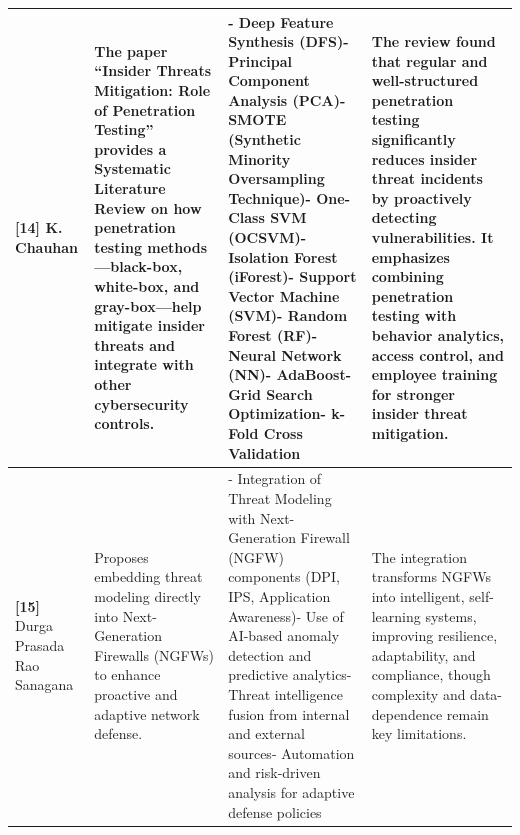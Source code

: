 \begin{scriptsize}
\begin{longtable}{|p{1.8cm}|p{4.2cm}|p{4.0cm}|p{3.8cm}|}
\textbf{[14]} K. Chauhan & The paper ``Insider Threats Mitigation: Role of Penetration Testing'' provides a Systematic Literature Review on how penetration testing methods---black-box, white-box, and gray-box---help mitigate insider threats and integrate with other cybersecurity controls. & - Deep Feature Synthesis (DFS)\newline - Principal Component Analysis (PCA)\newline - SMOTE (Synthetic Minority Oversampling Technique)\newline - One-Class SVM (OCSVM)\newline - Isolation Forest (iForest)\newline - Support Vector Machine (SVM)\newline - Random Forest (RF)\newline - Neural Network (NN)\newline - AdaBoost\newline - Grid Search Optimization\newline - k-Fold Cross Validation & The review found that regular and well-structured penetration testing significantly reduces insider threat incidents by proactively detecting vulnerabilities. It emphasizes combining penetration testing with behavior analytics, access control, and employee training for stronger insider threat mitigation. \\
\hline
\textbf{[15]} Durga Prasada Rao Sanagana & Proposes embedding threat modeling directly into Next-Generation Firewalls (NGFWs) to enhance proactive and adaptive network defense. & - Integration of Threat Modeling with Next-Generation Firewall (NGFW) components (DPI, IPS, Application Awareness)\newline - Use of AI-based anomaly detection and predictive analytics\newline - Threat intelligence fusion from internal and external sources\newline - Automation and risk-driven analysis for adaptive defense policies & The integration transforms NGFWs into intelligent, self-learning systems, improving resilience, adaptability, and compliance, though complexity and data-dependence remain key limitations. \\
\hline

\end{longtable}
\end{scriptsize}
